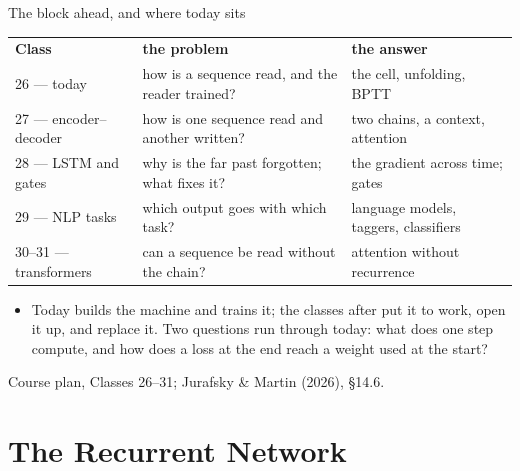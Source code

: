 \documentclass[aspectratio=169, 11pt]{beamer}
\newcommand{\srcline}[1]{%
  \par\vspace{0.25em}%
  {\scriptsize\color{mcMuted}\hfill #1\par}}
\begin{document}
\begin{frame}{The block ahead, and where today sits}
  \vspace{0.1em}
  {\scriptsize
  \renewcommand{\arraystretch}{1.3}
  \begin{tabular}{@{}l@{\hspace{0.8em}}l@{\hspace{0.8em}}l@{}}
    \textbf{Class} & \textbf{the problem} & \textbf{the answer}\\
    \alert{26 --- today} & how is a sequence read, and the reader trained? & the cell, unfolding, BPTT\\
    27 --- encoder--decoder & how is one sequence read and another written? & two chains, a context, attention\\
    28 --- LSTM and gates & why is the far past forgotten; what fixes it? & the gradient across time; gates\\
    29 --- NLP tasks & which output goes with which task? & language models, taggers, classifiers\\
    30--31 --- transformers & can a sequence be read without the chain? & attention without recurrence\\
  \end{tabular}}
  \vspace{0.4em}

  {\footnotesize
  \begin{itemize}\itemsep0.2em
    \item Today builds the machine and trains it; the classes after put
          it to work, open it up, and replace it. Two questions run through
          today: what does one step compute, and how does a loss at the end
          reach a weight used at the start?
  \end{itemize}}
  \srcline{Course plan, Classes 26--31; Jurafsky \& Martin (2026), \S14.6.}
\end{frame}

\section{The Recurrent Network}
\end{document}
